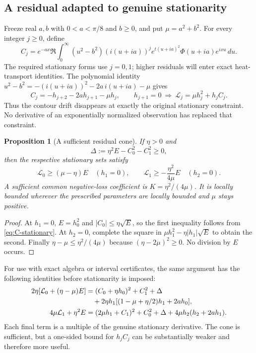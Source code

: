 \documentclass[11pt]{article}
\numberwithin{equation}{section}
\newtheorem{proposition}[theorem]{Proposition}
\theoremstyle{definition}
\theoremstyle{remark}
\newcommand{\dd}{\,d}
\newcommand{\Lag}{\mathcal L}
\begin{document}
\subsection{A residual adapted to genuine stationarity}
Freeze real $a,b$ with $0<a<\pi/8$ and $b\ge0$, and put $\mu=a^2+b^2$.
For every integer $j\ge0$, define
\begin{equation}
 C_j=e^{-ax}\Re\int_0^\infty (u^2-b^2)(i(u+ia))^j
             e^{t(u+ia)^2}\Phi(u+ia)e^{ixu}\dd u.
 \label{eq:C-integral}
\end{equation}
The required stationary forms use $j=0,1$; higher residuals will enter
exact heat-transport identities. The polynomial identity
$u^2-b^2=-(i(u+ia))^2-2a\,i(u+ia)-\mu$ gives
\begin{equation}
 C_j=-h_{j+2}-2ah_{j+1}-\mu h_j,
 \qquad h_{j+1}=0\ \Longrightarrow\
 \Lag_j=\mu h_j^2+h_jC_j.
 \label{eq:C-stationary}
\end{equation}
Thus the contour drift disappears at exactly the original stationary
constraint. No derivative of an exponentially normalized observation
has replaced that constraint.

\begin{proposition}[A sufficient residual cone]\label{prop:residual-cone}
If $\eta>0$ and
\begin{equation}
 \Delta:=\eta^2E-C_0^2-C_1^2\ge0,
 \label{eq:cone-slack}
\end{equation}
then the respective stationary sets satisfy
\begin{equation}
 \Lag_0\ge(\mu-\eta)E\quad(h_1=0),\qquad
 \Lag_1\ge-\frac{\eta^2}{4\mu}E\quad(h_2=0).
 \label{eq:cone-losses}
\end{equation}
A sufficient common negative-loss coefficient is $K=\eta^2/(4\mu)$.
It is locally bounded wherever the prescribed parameters are locally
bounded and $\mu$ stays positive.
\end{proposition}
\begin{proof}
At $h_1=0$, $E=h_0^2$ and $|C_0|\le\eta\sqrt E$, so the first
inequality follows from \eqref{eq:C-stationary}. At $h_2=0$, complete
the square in $\mu h_1^2-\eta|h_1|\sqrt E$ to obtain the second.
Finally $\eta-\mu\le\eta^2/(4\mu)$ because
$(\eta-2\mu)^2\ge0$. No division by $E$ occurs.
\end{proof}

For use with exact algebra or interval certificates, the same argument
has the following identities before stationarity is imposed:
\begin{align}
 2\eta[\Lag_0+(\eta-\mu)E]
 &= (C_0+\eta h_0)^2+C_1^2+\Delta\notag\\
 &\quad+2\eta h_1[(1-\mu+\eta/2)h_1+2ah_0],
 \label{eq:cone-SOS0}\\
 4\mu\Lag_1+\eta^2E
 &= (2\mu h_1+C_1)^2+C_0^2+\Delta
             +4\mu h_2(h_2+2ah_1).
 \label{eq:cone-SOS1}
\end{align}
Each final term is a multiple of the genuine stationary derivative.
The cone is sufficient, but a one-sided bound for $h_jC_j$ can be
substantially weaker and therefore more useful.
\end{document}
